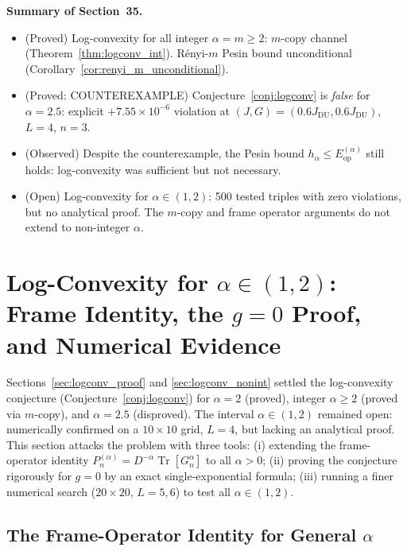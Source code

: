 \documentclass[12pt,a4paper]{article}
\begin{document}
\bigskip
\noindent\textbf{Summary of Section~35.}
\begin{itemize}
\item (Proved) Log-convexity for all integer $\alpha=m\geq 2$: $m$-copy channel
  (Theorem~\ref{thm:logconv_int}).  Rényi-$m$ Pesin bound unconditional
  (Corollary~\ref{cor:renyi_m_unconditional}).
\item (Proved: COUNTEREXAMPLE) Conjecture~\ref{conj:logconv} is \emph{false} for $\alpha=2.5$:
  explicit $+7.55\times10^{-6}$ violation at $(J,G)=(0.6J_\mathrm{DU},0.6J_\mathrm{DU})$, $L=4$, $n=3$.
\item (Observed) Despite the counterexample, the Pesin bound $h_\alpha\leq E_{\mathrm{op}}^{(\alpha)}$
  still holds: log-convexity was sufficient but not necessary.
\item (Open) Log-convexity for $\alpha\in(1,2)$: 500 tested triples with zero violations,
  but no analytical proof.  The $m$-copy and frame operator arguments do not extend to
  non-integer $\alpha$.
\end{itemize}

\section{Log-Convexity for $\alpha\in(1,2)$: Frame Identity, the $g=0$ Proof, and Numerical Evidence}
\label{sec:logconv_half}

Sections~\ref{sec:logconv_proof} and \ref{sec:logconv_nonint} settled the
log-convexity conjecture (Conjecture~\ref{conj:logconv}) for $\alpha=2$ (proved),
integer $\alpha\geq 2$ (proved via $m$-copy), and $\alpha=2.5$ (disproved).
The interval $\alpha\in(1,2)$ remained open: numerically confirmed on a
$10\times10$ grid, $L=4$, but lacking an analytical proof.
This section attacks the problem with three tools:
(i) extending the frame-operator identity $P_n^{(\alpha)}=D^{-\alpha}\operatorname{Tr}[G_n^\alpha]$
to all $\alpha>0$; (ii) proving the conjecture rigorously for $g=0$ by an exact
single-exponential formula; (iii) running a finer numerical search ($20\times20$,
$L=5,6$) to test all $\alpha\in(1,2)$.

\subsection{The Frame-Operator Identity for General $\alpha$}
\label{sec:frame_id_alpha}
\end{document}
